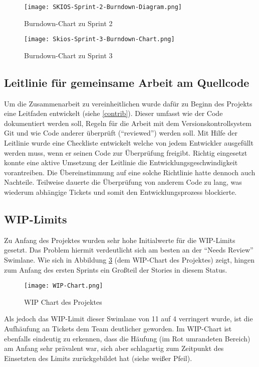 \begin{figure}[H]
    \texttt{[image: SKIOS-Sprint-2-Burndown-Diagram.png]}
    \caption{Burndown-Chart zu Sprint 2}
    \label{fig:SKIOS-Sprint-2-Burndown}
\end{figure}

\begin{figure}
    \texttt{[image: Skios-Sprint-3-Burndown-Chart.png]}
    \caption{Burndown-Chart zu Sprint 3}
    \label{fig:SKIOS-Sprint-3-Burndown}
\end{figure}


\subsection{Leitlinie für gemeinsame Arbeit am Quellcode}
Um die Zusammenarbeit zu vereinheitlichen wurde dafür zu Beginn des Projekts eine Leitfaden entwickelt (siehe \ref{contrib}).
Dieser umfasst wie der Code dokumentiert werden soll, Regeln für die Arbeit mit dem Versionskontrollsystem Git 
und wie Code anderer überprüft (\enquote{reviewed}) werden soll. Mit Hilfe der Leitlinie wurde eine Checkliste entwickelt 
welche von jedem Entwickler ausgefüllt werden muss, wenn er seinen Code zur Überprüfung freigibt. Richtig
eingesetzt konnte eine aktive Umsetzung der Leitlinie die Entwicklungsgeschwindigkeit vorantreiben. Die 
Übereinstimmung auf eine solche Richtlinie hatte dennoch auch Nachteile. Teilweise dauerte die Überprüfung von 
anderem Code zu lang, was wiederum abhängige Tickets und somit den Entwicklungsprozess blockierte.

\subsection{WIP-Limits}
Zu Anfang des Projektes wurden sehr hohe Initialwerte für die \ac{WIP}-Limits gesetzt.
Das Problem hiermit verdeutlicht sich am besten an der \enquote{Needs Review} Swimlane.
Wie sich in Abbildung \ref{fig:WIP} (dem \ac{WIP}-Chart des Projektes) zeigt, hingen zum Anfang des ersten Sprints ein Großteil der Stories in diesem Status.

\begin{figure}
    \centering
    \texttt{[image: WIP-Chart.png]}
    \caption{WIP Chart des Projektes}
    \label{fig:WIP}
\end{figure}

Als jedoch das \ac{WIP}-Limit dieser Swimlane von 11 auf 4 verringert wurde, ist die Aufhäufung an Tickets dem Team deutlicher geworden.
Im \ac{WIP}-Chart ist ebenfalls eindeutig zu erkennen, dass die Häufung (im Rot umrandeten Bereich) am Anfang sehr prävalent war, sich aber schlagartig zum Zeitpunkt des Einsetzten des Limits zurückgebildet hat (siehe weißer Pfeil).

